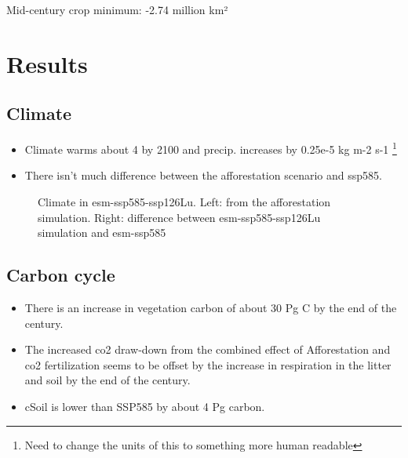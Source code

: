 \documentclass[]{article}
\begin{document}
Mid-century crop minimum: -2.74 million km²

\section{Results}

\subsection{Climate}

\begin{itemize}
    \item Climate warms about 4 \textcelsius{} by 2100 and precip. increases by 0.25e-5 kg m-2 s-1 \footnote{Need to change the units of this to something more human readable}

    \item There isn't much difference between the afforestation scenario and ssp585.
\end{itemize}

\begin{figure}[!ht]
    \centering
    \begin{subfigure}[b]{0.45\linewidth}
        
    \end{subfigure}
    \begin{subfigure}[b]{0.45\linewidth}
        
    \end{subfigure}
    \begin{subfigure}[b]{0.45\linewidth}
        
    \end{subfigure}
    \begin{subfigure}[b]{0.45\linewidth}
        
    \end{subfigure}
    \caption{Climate in esm-ssp585-ssp126Lu. Left: from the afforestation simulation. Right: difference between esm-ssp585-ssp126Lu simulation and esm-ssp585}
    \label{fig:climate}
\end{figure}


\subsection{Carbon cycle}

\begin{itemize}
\item There is an increase in vegetation carbon of about 30 Pg C by the end of the century.

\item The increased co2 draw-down from the combined effect of Afforestation and co2 fertilization seems to be offset by the increase in respiration in the litter and soil by the end of the century.

\item cSoil is lower than SSP585 by about 4 Pg carbon.
\end{itemize}
\end{document}
